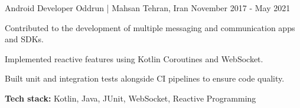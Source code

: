 \begin{cventries}
    \cventry
    {Android Developer} %
    {Oddrun | Mahsan} %
    {Tehran, Iran} %
    {November 2017 - May 2021} %
    {
      \begin{cvitems} %
        \item Contributed to the development of multiple messaging and communication apps and SDKs.
        \item Implemented reactive features using Kotlin Coroutines and WebSocket.
        \item Built unit and integration tests alongside CI pipelines to ensure code quality.
        \item \textbf{Tech stack:} Kotlin, Java, JUnit, WebSocket, Reactive Programming
      \end{cvitems}
    }

\end{cventries}
